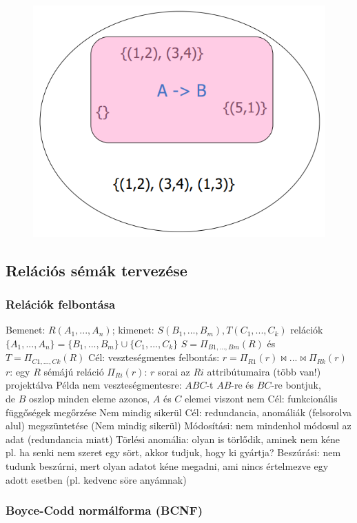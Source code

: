 \documentclass[12pt,a4paper]{article}
\begin{document}
\begin{figure}[h!]
	\centering
	\includegraphics[width=0.5\linewidth]{FF-geometriai-reprezentáció}
\end{figure}

\pagebreak

\subsection{Relációs sémák tervezése}

\subsubsection{Relációk felbontása}

\begin{outline}
	\1 Bemenet: $R(A_1,...,A_n)$; kimenet: $S(B_1,...,B_m),T(C_1,...,C_k)$ relációk
		\2 $\{A_1,...,A_n\} = \{B_1,...,B_m\} \cup \{C_1,...,C_k\}$
		\2 $S = \Pi_{B1,...,Bm}(R)$ és $T=\Pi_{C1,...,Ck}(R)$
	\1 Cél: veszteségmentes felbontás: $r = \Pi_{R1}(r) \bowtie ... \bowtie \Pi_{Rk}(r)$
		\2 $r$: egy $R$ sémájú reláció
		\2 $\Pi_{Ri}(r)$: $r$ sorai az $Ri$ attribútumaira (több van!) projektálva
		\2 Példa nem veszteségmentesre: $ABC$-t $AB$-re és $BC$-re bontjuk,\\
		de $B$ oszlop minden eleme azonos, $A$ és $C$ elemei viszont nem
	\1 Cél: funkcionális függőségek megőrzése
		\2 Nem mindig sikerül
	\1 Cél: redundancia, anomáliák (felsorolva alul) megszüntetése
		\2 (Nem mindig sikerül)
		\2 Módosítási: nem mindenhol módosul az adat (redundancia miatt)
		\2 Törlési anomália: olyan is törlődik, aminek nem kéne\\
		pl. ha senki nem szeret egy sört, akkor tudjuk, hogy ki gyártja?
		\2 Beszúrási: nem tudunk beszúrni, mert olyan adatot kéne megadni, ami nincs értelmezve egy adott esetben (pl. kedvenc söre anyámnak)
\end{outline}

\pagebreak

\subsubsection{Boyce-Codd normálforma (BCNF)}
\end{document}
